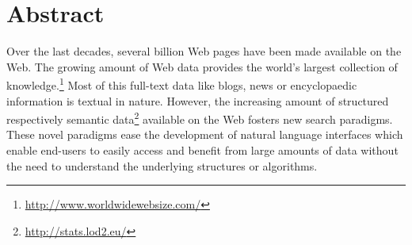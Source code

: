 \chapter*{Abstract}
Over the last decades, several billion Web pages have been made available on the Web. 
The growing amount of Web data provides the world's largest collection of knowledge.\footnote{\url{http://www.worldwidewebsize.com/}} 
Most of this full-text data like blogs, news or encyclopaedic information is textual in nature.
However, the increasing amount of structured respectively semantic data\footnote{\url{http://stats.lod2.eu/}} available on the Web fosters new search paradigms.
These novel paradigms ease the development of natural language interfaces which enable end-users to easily access and benefit from large amounts of data without the need to understand the underlying structures or algorithms.

